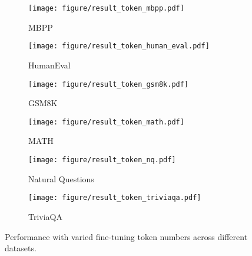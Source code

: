 \begin{figure}[!t]
    \centering
    \begin{subfigure}[b]{0.48\columnwidth}
        \centering
        \texttt{[image: figure/result\_token\_mbpp.pdf]}
        \caption{MBPP}
    \end{subfigure}
    \begin{subfigure}[b]{0.48\columnwidth}
        \centering
        \texttt{[image: figure/result\_token\_human\_eval.pdf]}
        \caption{HumanEval}
    \end{subfigure}
    \begin{subfigure}[b]{0.48\columnwidth}
        \centering
        \texttt{[image: figure/result\_token\_gsm8k.pdf]}
        \caption{GSM8K}
    \end{subfigure}
    \begin{subfigure}[b]{0.48\columnwidth}
        \centering
        \texttt{[image: figure/result\_token\_math.pdf]}
        \caption{MATH}
    \end{subfigure}
    \begin{subfigure}[b]{0.48\columnwidth}
        \centering
        \texttt{[image: figure/result\_token\_nq.pdf]}
        \caption{Natural Questions}
    \end{subfigure}
    \begin{subfigure}[b]{0.48\columnwidth}
        \centering
        \texttt{[image: figure/result\_token\_triviaqa.pdf]}
        \caption{TriviaQA}
    \end{subfigure}
    \caption{Performance with varied fine-tuning token numbers across different datasets.}
    \label{fig:result_token}
\end{figure}




